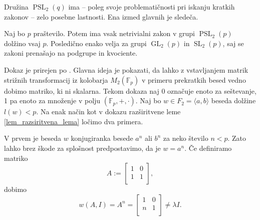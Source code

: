     Družina $\operatorname{PSL}_2(q)$ ima -- poleg svoje problematičnosti pri iskanju kratkih zakonov -- zelo posebne lastnosti. Ena izmed glavnih je sledeča. 
    \begin{trditev}\label{trd_dolzina_zakonov_za_psl2p}
    Naj bo $p$ praštevilo. Potem ima vsak netrivialni zakon v grupi $\operatorname{PSL}_2(p)$ dolžino vsaj $p$. Posledično enako velja za grupi $\operatorname{GL}_2(p)$ in $\operatorname{SL}_2(p)$,
    saj se zakoni prenašajo na podgrupe in kvociente.
    \end{trditev}
    \begin{dokaz}
        Dokaz je prirejen po \cite[str.~38--39]{Schneider_2016}. Glavna ideja je pokazati, da lahko z vstavljanjem matrik strižnih transformacij iz kolobarja $M_2(\mathbb{F}_p)$
        v primeru prekratkih besed vedno dobimo matriko, ki ni skalarna. Tekom dokaza naj 0 označuje enoto za seštevanje, 1 pa enoto za množenje v polju $(\mathbb{F}_p, +, \cdot)$.
        Naj bo $w \in F_2 = \langle  a, b \rangle$ beseda dolžine $l(w) < p$. 
         Na enak način kot v dokazu razširitvene leme \ref{lem_razsiritvena_lema} ločimo dva primera.
         
         V prvem je beseda $w$ konjugiranka besede $a^{n}$ ali $b^{n}$ za neko število $n < p$. Zato lahko brez škode za splošnost predpostavimo, da je $w = a^{n}$.
         Če definiramo matriko \begin{equation*}
         A := \begin{bmatrix}
            1 & 0\\
            1 & 1 \\
         \end{bmatrix},
         \end{equation*}  
            dobimo \begin{equation*}
            w(A, I) = A^{n} =  \begin{bmatrix}
                1 & 0\\
                n & 1\\
             \end{bmatrix} \neq \lambda I.
            \end{equation*}  
        

\end{dokaz}
